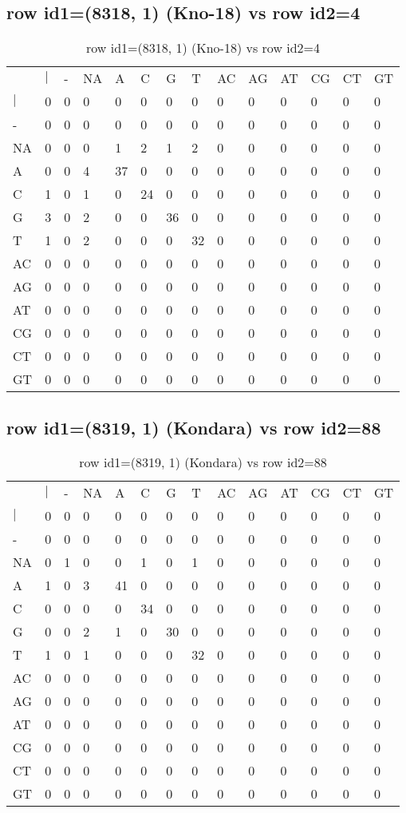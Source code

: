 \subsection{row id1=(8318, 1) (Kno-18) vs row id2=4}
\begin{center}
\begin{longtable}{|l|l|l|l|l|l|l|l|l|l|l|l|l|l|}
\caption{row id1=(8318, 1) (Kno-18) vs row id2=4} \label{table_dm308}\\
\hline
\\
\hline
&$|$&-&NA&A&C&G&T&AC&AG&AT&CG&CT&GT\\
$|$&0&0&0&0&0&0&0&0&0&0&0&0&0\\
-&0&0&0&0&0&0&0&0&0&0&0&0&0\\
NA&0&0&0&1&2&1&2&0&0&0&0&0&0\\
A&0&0&4&37&0&0&0&0&0&0&0&0&0\\
C&1&0&1&0&24&0&0&0&0&0&0&0&0\\
G&3&0&2&0&0&36&0&0&0&0&0&0&0\\
T&1&0&2&0&0&0&32&0&0&0&0&0&0\\
AC&0&0&0&0&0&0&0&0&0&0&0&0&0\\
AG&0&0&0&0&0&0&0&0&0&0&0&0&0\\
AT&0&0&0&0&0&0&0&0&0&0&0&0&0\\
CG&0&0&0&0&0&0&0&0&0&0&0&0&0\\
CT&0&0&0&0&0&0&0&0&0&0&0&0&0\\
GT&0&0&0&0&0&0&0&0&0&0&0&0&0\\
\hline
\end{longtable}
\end{center}

\subsection{row id1=(8319, 1) (Kondara) vs row id2=88}
\begin{center}
\begin{longtable}{|l|l|l|l|l|l|l|l|l|l|l|l|l|l|}
\caption{row id1=(8319, 1) (Kondara) vs row id2=88} \label{table_dm310}\\
\hline
\\
\hline
&$|$&-&NA&A&C&G&T&AC&AG&AT&CG&CT&GT\\
$|$&0&0&0&0&0&0&0&0&0&0&0&0&0\\
-&0&0&0&0&0&0&0&0&0&0&0&0&0\\
NA&0&1&0&0&1&0&1&0&0&0&0&0&0\\
A&1&0&3&41&0&0&0&0&0&0&0&0&0\\
C&0&0&0&0&34&0&0&0&0&0&0&0&0\\
G&0&0&2&1&0&30&0&0&0&0&0&0&0\\
T&1&0&1&0&0&0&32&0&0&0&0&0&0\\
AC&0&0&0&0&0&0&0&0&0&0&0&0&0\\
AG&0&0&0&0&0&0&0&0&0&0&0&0&0\\
AT&0&0&0&0&0&0&0&0&0&0&0&0&0\\
CG&0&0&0&0&0&0&0&0&0&0&0&0&0\\
CT&0&0&0&0&0&0&0&0&0&0&0&0&0\\
GT&0&0&0&0&0&0&0&0&0&0&0&0&0\\
\hline
\end{longtable}
\end{center}

